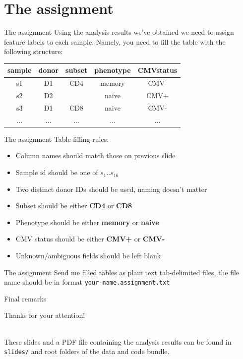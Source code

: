 \documentclass[12pt]{beamer}
\begin{document}
\section{The assignment}

\begin{frame}{The assignment}
Using the analysis results we've obtained we need to assign feature labels to each sample. Namely, you need to fill the table with the following structure:
\begin{table}[h!]
  \begin{center}
    \begin{tabular}{c|c|c|c|c}
      \textbf{sample} & \textbf{donor} & \textbf{subset} & \textbf{phenotype} & \textbf{CMVstatus} \\
      \hline
      s1 & D1 & CD4 & memory & CMV- \\
      s2 & D2 &   & naive & CMV+ \\
      s3 & D1 & CD8 & naive & CMV- \\
      ... & ... & ... & ... & ... \\
    \end{tabular}
  \end{center}
\end{table}
\end{frame}

\begin{frame}{The assignment}
Table filling rules:
\begin{itemize}
\item Column names should match those on previous slide
\item Sample id should be one of $s_1..s_{16}$
\item Two distinct donor IDs should be used, naming doesn't matter
\item Subset should be either \textbf{CD4} or \textbf{CD8}
\item Phenotype should be either \textbf{memory} or \textbf{naive}
\item CMV status should be either \textbf{CMV+} or \textbf{CMV-}
\item Unknown/ambiguous fields should be left blank
\end{itemize}
\end{frame}

\begin{frame}{The assignment}
Send me filled tables as plain text tab-delimited files, the file name should be in format \texttt{your-name.assignment.txt}
\end{frame}

\begin{frame}{Final remarks}
\begin{LARGE}
\begin{center}
Thanks for your attention!\\~\
\end{center}
\end{LARGE}


These slides and a PDF file containing the analysis results can be found in \texttt{slides/} and root folders of the data and code bundle.
\end{frame}
\end{document}
